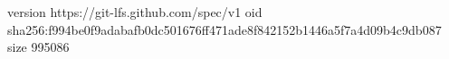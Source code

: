 version https://git-lfs.github.com/spec/v1
oid sha256:f994be0f9adabafb0dc501676ff471ade8f842152b1446a5f7a4d09b4c9db087
size 995086

